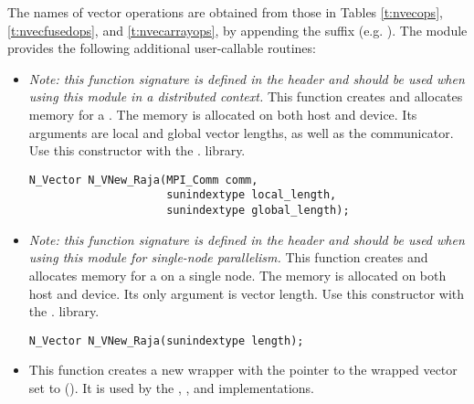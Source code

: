 The names of vector operations are obtained from those in Tables \ref{t:nvecops},
\ref{t:nvecfusedops}, and \ref{t:nvecarrayops}, by appending the suffix 
(e.g. ).
The module {\nvecraja}  provides the following additional user-callable routines:
\begin{itemize}



\item {}

  \textit{Note: this function signature is defined in the header 
    and should be used when using this module in a distributed context.}
  This function creates and allocates memory for a {\raja} .
  The memory is allocated on both host and device. Its arguments are local
  and global vector lengths, as well as the {\mpi} communicator. Use this 
  constructor with the . library.

\begin{verbatim}
N_Vector N_VNew_Raja(MPI_Comm comm,
                     sunindextype local_length,
                     sunindextype global_length);
\end{verbatim}



\item {}

  \textit{Note: this function signature is defined in the header 
    and should be used when using this module for single-node parallelism.}
  This function creates and allocates memory for a {\raja} 
  on a single node. The memory is allocated on both host and device.
  Its only argument is vector length. Use this constructor with the 
  . library.

\begin{verbatim}
N_Vector N_VNew_Raja(sunindextype length);
\end{verbatim}



\item {}

  This function creates a new {\nvector} wrapper with the pointer to
  the wrapped {\raja} vector set to (). It is used by the
  , , and 
  implementations.


\end{itemize}

